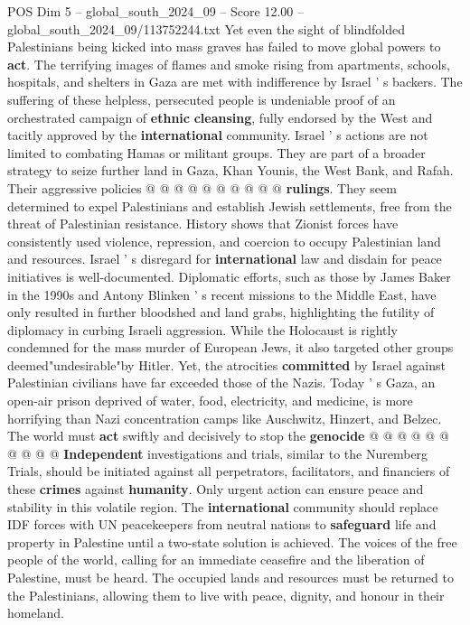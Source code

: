 \begin{textsample}{POS Dim 5 – global\_south\_2024\_09 – Score 12.00 – global\_south\_2024\_09/113752244.txt}
Yet even the sight of blindfolded Palestinians being kicked into mass graves has failed to move global powers to \textbf{act}.
The terrifying images of flames and smoke rising from apartments, schools, hospitals, and shelters in Gaza are met with indifference by Israel ' s backers.
The suffering of these helpless, persecuted people is undeniable proof of an orchestrated campaign of \textbf{ethnic} \textbf{cleansing}, fully endorsed by the West and tacitly approved by the \textbf{international} community.
Israel ' s actions are not limited to combating Hamas or militant groups.
They are part of a broader strategy to seize further land in Gaza, Khan Younis, the West Bank, and Rafah.
Their aggressive policies @ @ @ @ @ @ @ @ @ @ \textbf{rulings}.
They seem determined to expel Palestinians and establish Jewish settlements, free from the threat of Palestinian resistance.
History shows that Zionist forces have consistently used violence, repression, and coercion to occupy Palestinian land and resources.
Israel ' s disregard for \textbf{international} law and disdain for peace initiatives is well-documented.
Diplomatic efforts, such as those by James Baker in the 1990s and Antony Blinken ' s recent missions to the Middle East, have only resulted in further bloodshed and land grabs, highlighting the futility of diplomacy in curbing Israeli aggression.
While the Holocaust is rightly condemned for the mass murder of European Jews, it also targeted other groups deemed"undesirable"by Hitler.
Yet, the atrocities \textbf{committed} by Israel against Palestinian civilians have far exceeded those of the Nazis.
Today ' s Gaza, an open-air prison deprived of water, food, electricity, and medicine, is more horrifying than Nazi concentration camps like Auschwitz, Hinzert, and Belzec.
The world must \textbf{act} swiftly and decisively to stop the \textbf{genocide} @ @ @ @ @ @ @ @ @ @ \textbf{Independent} investigations and trials, similar to the Nuremberg Trials, should be initiated against all perpetrators, facilitators, and financiers of these \textbf{crimes} against \textbf{humanity}.
Only urgent action can ensure peace and stability in this volatile region.
The \textbf{international} community should replace IDF forces with UN peacekeepers from neutral nations to \textbf{safeguard} life and property in Palestine until a two-state solution is achieved.
The voices of the free people of the world, calling for an immediate ceasefire and the liberation of Palestine, must be heard.
The occupied lands and resources must be returned to the Palestinians, allowing them to live with peace, dignity, and honour in their homeland.

\end{textsample}
